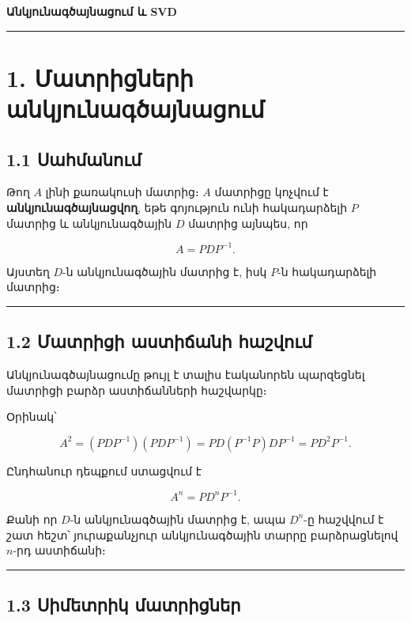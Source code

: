 \documentclass[12pt, a4paper]{article}
\begin{document}
\begin{center}
    \Huge \textbf{Անկյունագծայնացում և SVD}
\end{center}

\tableofcontents
\vspace{2em}
\hrule
\vspace{2em}

\section{1. Մատրիցների անկյունագծայնացում}

\subsection{1.1 Սահմանում}

Թող \(A\) լինի քառակուսի մատրից։ \(A\) մատրիցը կոչվում է \textbf{անկյունագծայնացվող}, եթե գոյություն ունի հակադարձելի \(P\) մատրից և անկյունագծային \(D\) մատրից այնպես, որ

$$
A = P D P^{-1}.
$$

Այստեղ \(D\)-ն անկյունագծային մատրից է, իսկ \(P\)-ն հակադարձելի մատրից։

\vspace{1em}
\hrule
\vspace{1em}

\subsection{1.2 Մատրիցի աստիճանի հաշվում}

Անկյունագծայնացումը թույլ է տալիս էականորեն պարզեցնել մատրիցի բարձր աստիճանների հաշվարկը։

Օրինակ՝

$$
A^2 = (PDP^{-1})(PDP^{-1}) 
= P D (P^{-1}P) D P^{-1} 
= P D^2 P^{-1}.
$$

Ընդհանուր դեպքում ստացվում է

$$
A^n = P D^n P^{-1}.
$$

Քանի որ \(D\)-ն անկյունագծային մատրից է, ապա \(D^n\)-ը հաշվվում է շատ հեշտ՝ յուրաքանչյուր անկյունագծային տարրը բարձրացնելով \(n\)-րդ աստիճանի։

\vspace{1em}
\hrule
\vspace{1em}

\subsection{1.3 Սիմետրիկ մատրիցներ}
\end{document}
